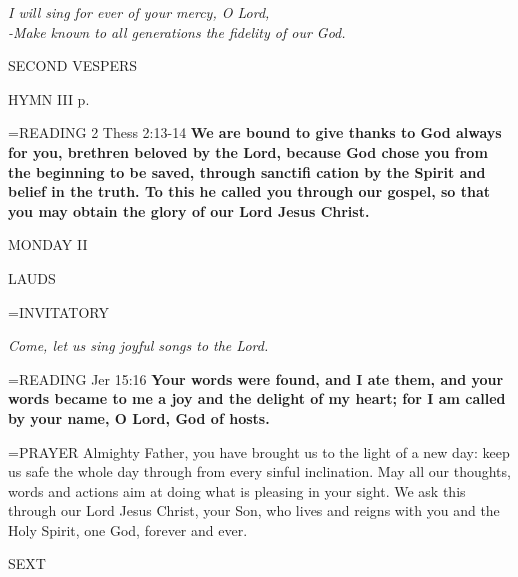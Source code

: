 \begin{center}
\textit{I will sing for ever of your mercy, O Lord, \\
-Make known to all generations the fidelity of our God.}
\end{center}

\begin{flushleft}\normalsize SECOND VESPERS\\\end{flushleft}

HYMN III p. \pageref{ordinaryTime:thirdHymn}

\hangindent=\parindent \small{READING} 2 Thess 2:13-14 \textbf{We are bound to give thanks to God always for you, brethren beloved by the Lord, because God chose you from the beginning to be saved, through sanctifi cation by the Spirit and belief in the truth. To this he called you through our gospel, so that you may obtain the glory of our Lord Jesus Christ.\\}

\begin{center}
\normalsize MONDAY II
\end{center}

\begin{flushleft}\normalsize LAUDS\\\end{flushleft}

\hangindent=\parindent \small{INVITATORY}
\begin{center}
\textit{Come, let us sing joyful songs to the Lord.\\}
\end{center}

\hangindent=\parindent \small{READING} Jer 15:16 \textbf{Your words were found, and I ate them, and your words became to me a joy and the delight of my heart; for I am called by your name, O Lord, God of hosts.\\}

\hangindent=\parindent \small{PRAYER  Almighty Father, you have brought us to the light of a new day: keep us safe the whole day through from every sinful inclination.  May all our thoughts, words and actions aim at doing what is pleasing in your sight. We ask this through our Lord Jesus Christ, your Son, who lives and reigns with you and the Holy Spirit, one God, forever and ever.}

\begin{flushleft}\normalsize SEXT\\\end{flushleft}

